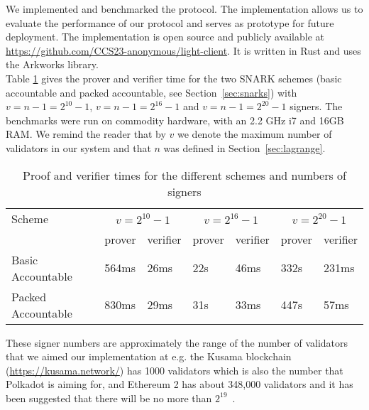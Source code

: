 \noindent We implemented and benchmarked the protocol. The implementation allows us to evaluate the performance of our protocol and serves as prototype for future deployment. The implementation 
is open source and publicly available at \url{https://github.com/CCS23-anonymous/light-client}. It is written in Rust and uses the Arkworks library. \\

\noindent Table \ref{tab:benchmarks} gives the prover and verifier time for the two SNARK schemes (basic accountable and packed accountable, see Section~\ref{sec:snarks}) with $v = n-1 = 2^{10}-1$, $v = n-1 = 2^{16}-1$ 
and $v=n-1=2^{20}-1$ signers. The benchmarks were run on commodity hardware, with an 2.2 GHz i7 and 16GB RAM. We remind the reader that by $v$ we denote the maximum number of  validators in our system and that $n$ was defined in Section~\ref{sec:lagrange}.\\

\begin{table}[h!]
\hfill
\begin{tabular}{| l | l | l | l | l |l | l |}
\hline
 Scheme & \multicolumn{2}{|c|}{$v = 2^{10}-1$} & \multicolumn{2}{|c|}{$v = 2^{16}-1$} & \multicolumn{2}{|c|}{$v = 2^{20}-1$}     \\
\cline{2-7}
 &  prover & verifier & prover & verifier &  prover & verifier \\
\hline

Basic Accountable & 564ms & 26ms & 22s & 46ms & 332s & 231ms \\
Packed Accountable & 830ms & 29ms & 31s & 33ms & 447s & 57ms \\

\hline
\end{tabular}
\caption{Proof and verifier times for the different schemes and numbers of signers}
\label{tab:benchmarks}
\end{table}

\noindent These signer numbers are approximately the range of the number of validators that we aimed our implementation at e.g. the Kusama blockchain (\url{https://kusama.network/}) has 1000 validators which is also the number that Polkadot is aiming for, and Ethereum 2 has about 348,000 validators and it has been suggested that there will be no more than $2^{19}$~\cite{ethresearch1}. \\

